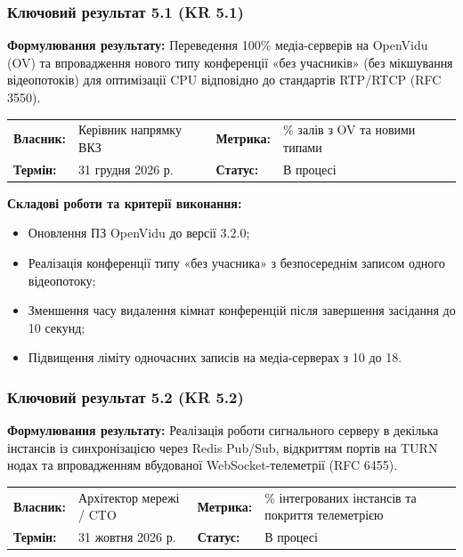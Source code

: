 \documentclass{article}
\begin{document}
\subsubsection{Ключовий результат 5.1 (KR 5.1)}

\textbf{Формулювання результату:} Переведення 100\% медіа-серверів на OpenVidu (OV) та впровадження нового типу конференції «без учасників» (без мікшування відеопотоків) для оптимізації CPU відповідно до стандартів RTP/RTCP (RFC 3550).

\noindent\begin{tabular}{@{}p{2.2cm}p{4.5cm}p{2.2cm}p{4.5cm}@{}}
\toprule
\textbf{Власник:} & Керівник напрямку ВКЗ & \textbf{Метрика:} & \% залів з OV та новими типами \\
\textbf{Термін:} & 31 грудня 2026 р. & \textbf{Статус:} & В процесі \\
\bottomrule
\end{tabular}

\vspace{10pt}
\textbf{Складові роботи та критерії виконання:}
\begin{itemize}
    \item Оновлення ПЗ OpenVidu до версії 3.2.0;
    \item Реалізація конференції типу «без учасника» з безпосереднім записом одного відеопотоку;
    \item Зменшення часу видалення кімнат конференцій після завершення засідання до 10 секунд;
    \item Підвищення ліміту одночасних записів на медіа-серверах з 10 до 18.
\end{itemize}

\subsubsection{Ключовий результат 5.2 (KR 5.2)}

\textbf{Формулювання результату:} Реалізація роботи сигнального серверу в декілька інстансів із синхронізацією через Redis Pub/Sub, відкриттям портів на TURN нодах та впровадженням вбудованої WebSocket-телеметрії (RFC 6455).

\noindent\begin{tabular}{@{}p{2.2cm}p{4.5cm}p{2.2cm}p{4.5cm}@{}}
\toprule
\textbf{Власник:} & Архітектор мережі / CTO & \textbf{Метрика:} & \% інтегрованих інстансів та покриття телеметрією \\
\textbf{Термін:} & 31 жовтня 2026 р. & \textbf{Статус:} & В процесі \\
\bottomrule
\end{tabular}
\end{document}
